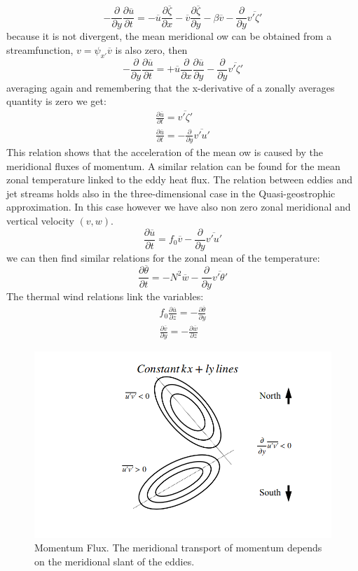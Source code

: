 $$-\frac{\partial}{\partial y}\frac{\partial\overline{u}}{\partial t}=-\overline{u}\frac{\partial\overline{\zeta}}{\partial x}-\overline{v}\frac{\partial\overline{\zeta}}{\partial y}-\beta\overline{v}-\frac{\partial}{\partial y}\overline{v'\zeta'}$$
because it is not divergent, the mean meridional ow can be obtained from a streamfunction, $v=\psi_{x'}\overline{v}$ is also zero, then
$$-\frac{\partial}{\partial y}\frac{\partial\overline{u}}{\partial t}=+\overline{u}\frac{\partial}{\partial x}\frac{\partial\overline{u}}{\partial y}-\frac{\partial}{\partial y}\overline{v'\zeta'}$$
averaging again and remembering that the x-derivative of a zonally averages quantity is zero we get:
\begin{align*}
	\frac{\partial\overline{u}}{\partial t}=\overline{v'\zeta'} \\
	\frac{\partial\overline{u}}{\partial t}=-\frac{\partial}{\partial y}\overline{v'u'}
\end{align*}
This relation shows that the acceleration of the mean ow is caused by the meridional fluxes of momentum. A similar relation can be found for the mean zonal temperature linked to the eddy heat flux. The relation between eddies and jet streams holds also in the three-dimensional case in the Quasi-geostrophic approximation. In this case however we have also non zero
zonal meridional and vertical velocity $(v,w)$.
$$\frac{\partial\overline{u}}{\partial t}=f_0\overline{v}-\frac{\partial}{\partial y}\overline{v'u'}$$
we can then find similar relations for the zonal mean of the temperature:
\begin{equation}\label{eq.zonal mean of temperature}
	\frac{\partial\overline{\theta}}{\partial t}=-N^2\overline{w}-\frac{\partial}{\partial y}\overline{v'\theta'}
\end{equation}
The thermal wind relations link the variables:
\begin{align}\label{eq.thermal wind}
	f_0\frac{\partial\overline{u}}{\partial z}=-\frac{\partial\overline{\theta}}{\partial y} \\
	\frac{\partial\overline{v}}{\partial y}=-\frac{\partial\overline{w}}{\partial z}
\end{align}
\begin{figure}[h!]
	\centering
	\includegraphics[width=0.5\linewidth]{uploads/Screenshot 2024-11-22 202457.png}
	\caption{Momentum Flux. The meridional transport of momentum depends on the meridional slant of the eddies.}
	\label{fig:enter-label}
\end{figure}


